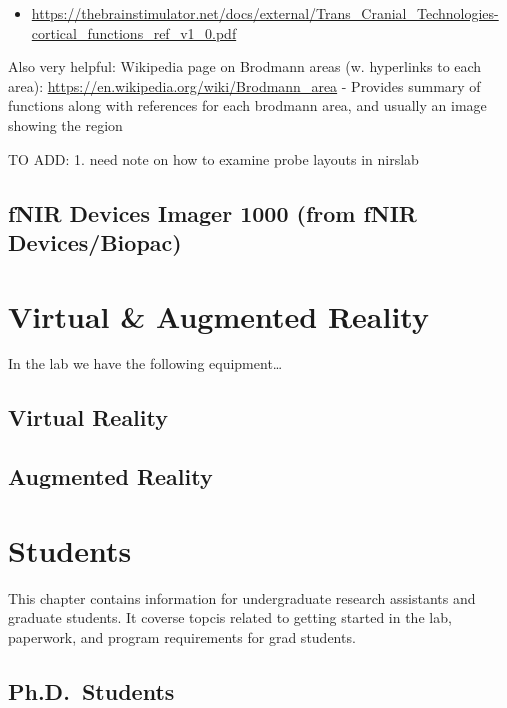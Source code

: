 \documentclass[
]{book}
\providecommand{\tightlist}{%
  \setlength{\itemsep}{0pt}\setlength{\parskip}{0pt}}
\begin{document}
\begin{itemize}
\tightlist
\item
  \url{https://thebrainstimulator.net/docs/external/Trans_Cranial_Technologies-cortical_functions_ref_v1_0.pdf}
\end{itemize}

Also very helpful: Wikipedia page on Brodmann areas (w. hyperlinks to each area):
\url{https://en.wikipedia.org/wiki/Brodmann_area}
- Provides summary of functions along with references for each brodmann area, and usually an image showing the region

TO ADD:
1. need note on how to examine probe layouts in nirslab

\hypertarget{fnir-devices-imager-1000-from-fnir-devicesbiopac}{%
\section{fNIR Devices Imager 1000 (from fNIR Devices/Biopac)}\label{fnir-devices-imager-1000-from-fnir-devicesbiopac}}

\hypertarget{virtual-augmented-reality}{%
\chapter{Virtual \& Augmented Reality}\label{virtual-augmented-reality}}

In the lab we have the following equipment\ldots{}

\hypertarget{virtual-reality}{%
\section{Virtual Reality}\label{virtual-reality}}

\hypertarget{augmented-reality}{%
\section{Augmented Reality}\label{augmented-reality}}

\hypertarget{students}{%
\chapter{Students}\label{students}}

This chapter contains information for undergraduate research assistants and graduate students. It coverse topcis related to getting started in the lab, paperwork, and program
requirements for grad students.

\hypertarget{ph.d.-students}{%
\section{Ph.D.~Students}\label{ph.d.-students}}
\end{document}
